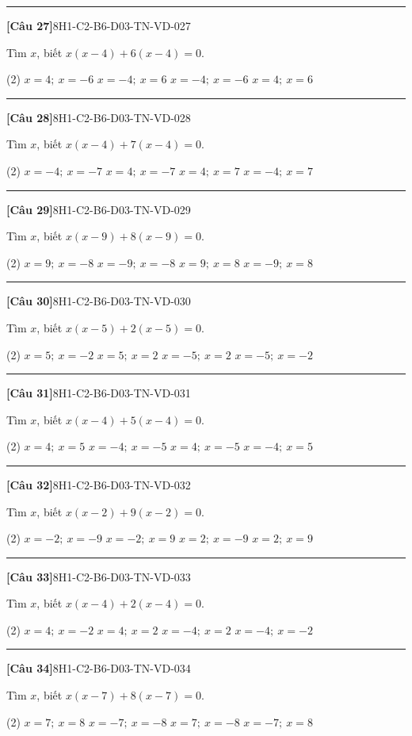 \documentclass[12pt,a4paper]{article}
\newif\ifloigiai
\newenvironment{cauhoi}[2]{%
  \par\medskip\noindent\rule{\textwidth}{0.4pt}\par\nopagebreak
  \noindent\textbf{[#1]}\hfill{\scriptsize\ttfamily #2}\par\nopagebreak\smallskip}{\par}
\newcommand{\dapan}[1]{\ifloigiai\par\smallskip\noindent\textit{Đáp án:} \textbf{#1}\par\fi}
\begin{document}
\begin{cauhoi}{Câu 27}{8H1-C2-B6-D03-TN-VD-027}
Tìm $x$, biết $x(x-4)+6(x-4)=0$.
\begin{tasks}(2)
\task $x=4;\ x=-6$
\task $x=-4;\ x=6$
\task $x=-4;\ x=-6$
\task $x=4;\ x=6$
\end{tasks}
\dapan{A}
\end{cauhoi}
\begin{cauhoi}{Câu 28}{8H1-C2-B6-D03-TN-VD-028}
Tìm $x$, biết $x(x-4)+7(x-4)=0$.
\begin{tasks}(2)
\task $x=-4;\ x=-7$
\task $x=4;\ x=-7$
\task $x=4;\ x=7$
\task $x=-4;\ x=7$
\end{tasks}
\dapan{B}
\end{cauhoi}
\begin{cauhoi}{Câu 29}{8H1-C2-B6-D03-TN-VD-029}
Tìm $x$, biết $x(x-9)+8(x-9)=0$.
\begin{tasks}(2)
\task $x=9;\ x=-8$
\task $x=-9;\ x=-8$
\task $x=9;\ x=8$
\task $x=-9;\ x=8$
\end{tasks}
\dapan{A}
\end{cauhoi}
\begin{cauhoi}{Câu 30}{8H1-C2-B6-D03-TN-VD-030}
Tìm $x$, biết $x(x-5)+2(x-5)=0$.
\begin{tasks}(2)
\task $x=5;\ x=-2$
\task $x=5;\ x=2$
\task $x=-5;\ x=2$
\task $x=-5;\ x=-2$
\end{tasks}
\dapan{A}
\end{cauhoi}
\begin{cauhoi}{Câu 31}{8H1-C2-B6-D03-TN-VD-031}
Tìm $x$, biết $x(x-4)+5(x-4)=0$.
\begin{tasks}(2)
\task $x=4;\ x=5$
\task $x=-4;\ x=-5$
\task $x=4;\ x=-5$
\task $x=-4;\ x=5$
\end{tasks}
\dapan{C}
\end{cauhoi}
\begin{cauhoi}{Câu 32}{8H1-C2-B6-D03-TN-VD-032}
Tìm $x$, biết $x(x-2)+9(x-2)=0$.
\begin{tasks}(2)
\task $x=-2;\ x=-9$
\task $x=-2;\ x=9$
\task $x=2;\ x=-9$
\task $x=2;\ x=9$
\end{tasks}
\dapan{C}
\end{cauhoi}
\begin{cauhoi}{Câu 33}{8H1-C2-B6-D03-TN-VD-033}
Tìm $x$, biết $x(x-4)+2(x-4)=0$.
\begin{tasks}(2)
\task $x=4;\ x=-2$
\task $x=4;\ x=2$
\task $x=-4;\ x=2$
\task $x=-4;\ x=-2$
\end{tasks}
\dapan{A}
\end{cauhoi}
\begin{cauhoi}{Câu 34}{8H1-C2-B6-D03-TN-VD-034}
Tìm $x$, biết $x(x-7)+8(x-7)=0$.
\begin{tasks}(2)
\task $x=7;\ x=8$
\task $x=-7;\ x=-8$
\task $x=7;\ x=-8$
\task $x=-7;\ x=8$
\end{tasks}
\dapan{C}
\end{cauhoi}
\end{document}
